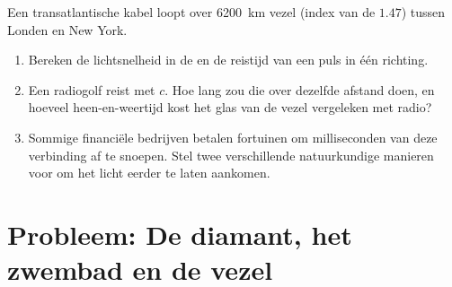 \begin{exercise}[$\star\star\star$]\label{exo:g10:refraction:15}
Een transatlantische kabel loopt over \qty{6200}{km} vezel (index van de
 $1.47$) tussen Londen en New York.
\begin{enumerate}
  \item Bereken de lichtsnelheid in de  en de reistijd van een puls
        in één richting.
  \item Een radiogolf reist met $c$. Hoe lang zou die over dezelfde
        afstand doen, en hoeveel heen-en-weertijd kost het glas van de
        vezel vergeleken met radio?
  \item Sommige financiële bedrijven betalen fortuinen om milliseconden
        van deze verbinding af te snoepen. Stel twee verschillende
        natuurkundige manieren voor om het licht eerder te laten
        aankomen.
\end{enumerate}
\end{exercise}

\section{Probleem: De diamant, het zwembad en de vezel}

